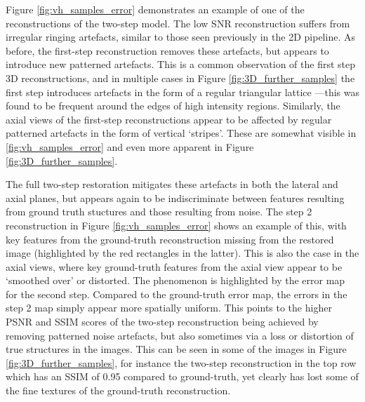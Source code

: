 \documentclass[12pt]{article}
\begin{document}
Figure \ref{fig:vh_samples_error} demonstrates an example of one of the reconstructions of the two-step model.
The low SNR reconstruction suffers from irregular ringing artefacts, similar to those seen previously in the 2D pipeline.
As before, the first-step reconstruction removes these artefacts,
but appears to introduce new patterned artefacts.
This is a common observation of the first step 3D reconstructions,
and in multiple cases in Figure \ref{fig:3D_further_samples} the first step introduces artefacts in the form of a regular triangular lattice
---this was found to be frequent around the edges of high intensity regions.
Similarly, the axial views of the first-step reconstructions appear to be affected by regular patterned artefacts in the form of vertical `stripes'.
These are somewhat visible in \ref{fig:vh_samples_error} and even more apparent in Figure \ref{fig:3D_further_samples}.

The full two-step restoration mitigates these artefacts in both the lateral and axial planes,
but appears again to be indiscriminate between features resulting from ground truth stuctures and those resulting from noise.
The step 2 reconstruction in Figure \ref{fig:vh_samples_error} shows an example of this,
with key features from the ground-truth reconstruction missing from the restored image (highlighted by the red rectangles in the latter).
This is also the case in the axial views, where key ground-truth features from the axial view appear to be `smoothed over' or distorted.
The phenomenon is highlighted by the error map for the second step.
Compared to the ground-truth error map, the errors in the step 2 map simply appear more spatially uniform.
This points to the higher PSNR and SSIM scores of the two-step reconstruction being achieved by removing patterned noise artefacts,
but also sometimes via a loss or distortion of true structures in the images.
This can be seen in some of the images in Figure \ref{fig:3D_further_samples},
for instance the two-step reconstruction in the top row which has an SSIM of 0.95 compared to ground-truth,
yet clearly has lost some of the fine textures of the ground-truth reconstruction.
\end{document}
